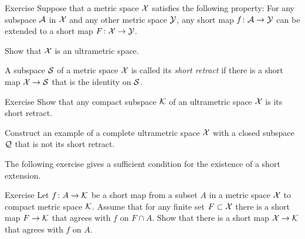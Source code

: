 \begin{thm}{Exercise}\label{ex:ultrametric}
Suppose that a metric space $\mathcal{X}$ satisfies the following property:
For any subspace $\mathcal{A}$ in $\mathcal{X}$ and any other metric space $\mathcal{Y}$, any short map $f\colon\mathcal{A}\to \mathcal{Y}$ can be extended to a short map $F\colon\mathcal{X}\to \mathcal{Y}$.

Show that $\mathcal{X}$ is an ultrametric space.
\end{thm}

A subspace $\mathcal{S}$ of a metric space $\mathcal{X}$ is called its \emph{short retract} if there is a short map $\mathcal{X}\to \mathcal{S}$ that is the identity on $\mathcal{S}$.

\begin{thm}{Exercise}\label{ex:ultrametric-converse}
Show that any compact subspace $\mathcal{K}$ of an ultrametric space $\mathcal{X}$ is its short retract.

Construct an example of a complete ultrametric space $\mathcal{X}$ with a closed subspace $\mathcal{Q}$ that is not its short retract.
\end{thm}

The following exercise gives a sufficient condition for the existence of a short extension.

\begin{thm}{Exercise}\label{ex:petrunin-stadler}
Let $f\:A\z\to \spc{K}$ be a short map from a subset $A$ in a metric space $\mathcal{X}$ to compact metric space $\mathcal{K}$.
Assume that for any finite set $F\subset \mathcal{X}$ there is a short map $F\to \mathcal{K}$ that agrees with $f$ on $F\cap A$.
Show that there is a short map $\mathcal{X}\to \mathcal{K}$ that agrees with $f$ on $A$.
\end{thm}
